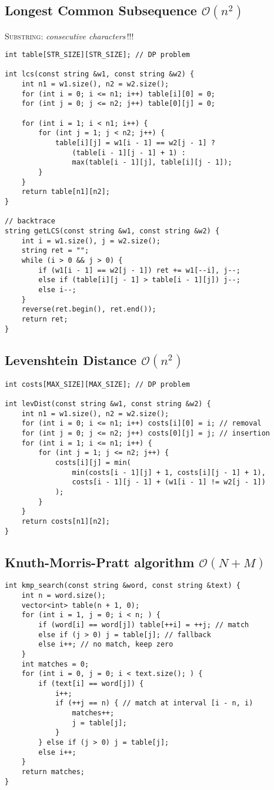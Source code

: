 \documentclass{article}
\begin{document}
\subsection{Longest Common Subsequence $\mathcal{O}(n^{2})$}
\textsc{Substring}: \textit{consecutive characters}\,!!!

\begin{lstlisting}
int table[STR_SIZE][STR_SIZE]; // DP problem

int lcs(const string &w1, const string &w2) {
	int n1 = w1.size(), n2 = w2.size();
	for (int i = 0; i <= n1; i++) table[i][0] = 0;
	for (int j = 0; j <= n2; j++) table[0][j] = 0;
	
	for (int i = 1; i < n1; i++) {
		for (int j = 1; j < n2; j++) {
			table[i][j] = w1[i - 1] == w2[j - 1] ? 
				(table[i - 1][j - 1] + 1) :
				max(table[i - 1][j], table[i][j - 1]);
		}
	}
	return table[n1][n2];
}

// backtrace
string getLCS(const string &w1, const string &w2) {
	int i = w1.size(), j = w2.size();
	string ret = "";
	while (i > 0 && j > 0) {
		if (w1[i - 1] == w2[j - 1]) ret += w1[--i], j--;
		else if (table[i][j - 1] > table[i - 1][j]) j--;
		else i--;
	}
	reverse(ret.begin(), ret.end());
	return ret;
}
\end{lstlisting}

\subsection{Levenshtein Distance $\mathcal{O}(n^{2})$}

\begin{lstlisting}
int costs[MAX_SIZE][MAX_SIZE]; // DP problem

int levDist(const string &w1, const string &w2) {
	int n1 = w1.size(), n2 = w2.size();
	for (int i = 0; i <= n1; i++) costs[i][0] = i; // removal
	for (int j = 0; j <= n2; j++) costs[0][j] = j; // insertion
	for (int i = 1; i <= n1; i++) {
		for (int j = 1; j <= n2; j++) {
			costs[i][j] = min(
				min(costs[i - 1][j] + 1, costs[i][j - 1] + 1),
				costs[i - 1][j - 1] + (w1[i - 1] != w2[j - 1])
			);
		}
	}
	return costs[n1][n2];
}
\end{lstlisting}

\subsection{Knuth-Morris-Pratt algorithm $\mathcal{O}(N + M)$}

\begin{lstlisting}
int kmp_search(const string &word, const string &text) {
	int n = word.size();
	vector<int> table(n + 1, 0);
	for (int i = 1, j = 0; i < n; ) {
		if (word[i] == word[j]) table[++i] = ++j; // match
		else if (j > 0) j = table[j]; // fallback
		else i++; // no match, keep zero
	}
	int matches = 0;
	for (int i = 0, j = 0; i < text.size(); ) {
		if (text[i] == word[j]) {
			i++;
			if (++j == n) { // match at interval [i - n, i)
				matches++;
				j = table[j];
			}
		} else if (j > 0) j = table[j];
		else i++;
	}
	return matches;
}
\end{lstlisting}
\end{document}
